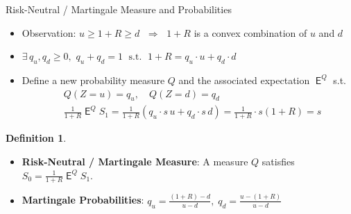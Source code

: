 \documentclass[10pt,handout]{beamer}
\newcommand{\ds}{\displaystyle}
\newcommand{\ie}{\;\Longrightarrow\;}
\newcommand{\ifff}{\;\Longleftrightarrow\;}
\DeclareMathOperator\expc{\mathsf{E}}
\theoremstyle{definition}
\newtheorem*{dfn}{Definition}
\newtheorem*{thm}{Theorem}
\begin{document}

\begin{frame}{Risk-Neutral / Martingale Measure and Probabilities}
  \begin{itemize}
    \item Observation: $u\geqslant 1+R \geqslant d$ $\ie$ $1 + R$ is a convex combination of $u$ and $d$  
    \item $\ds\exists\,q_u, q_d \geqslant 0,\,\,q_u+q_d = 1\;\text{ s.t. }\; 1 + R = q_u\cdot u + q_d\cdot d$
    \item Define a new probability measure $Q$ and the associated expectation $\expc^Q$ s.t. 
      \begin{align*}
        &Q(Z = u) = q_u,\quad Q(Z = d) = q_d \\
        &\frac{1}{1+R}\expc^Q S_1 = \frac{1}{1+R}(q_u\cdot s\,u + q_d\cdot s\,d) = \frac{1}{1+R}\cdot s(1+R) = s
      \end{align*}
  \end{itemize}
  \begin{dfn}
    \begin{itemize}
      \item \textbf{Risk-Neutral / Martingale Measure}: A measure $Q$ satisfies $\ds S_0 = \frac{1}{1+R}\expc^Q S_1$.
      \item \textbf{Martingale Probabilities}: $\ds q_u = \frac{(1+R)-d}{u-d}, \;q_d = \frac{u-(1+R)}{u-d}$
    \end{itemize}
  \end{dfn}
\end{frame}
\end{document}
